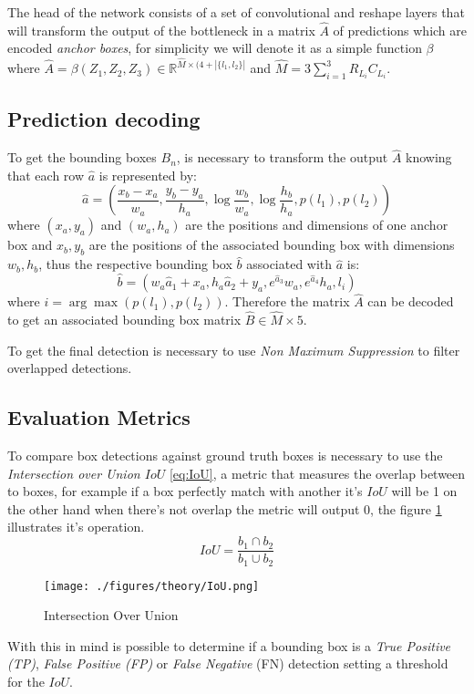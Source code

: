 \documentclass{IEEEtran}
\begin{document}
The head of the network consists of a set of convolutional and reshape layers
that will transform the output of the bottleneck in a matrix $\hat{A}$ of
predictions which are encoded \emph{anchor boxes}, for simplicity we will denote
it as a simple function $\beta$ where $\hat{A} = \beta(Z_1, Z_2, Z_3) \in
\mathbb{R}^{\hat{M} \times (4 + |\{l_1, l_2\}|}$ and $\hat{M} = 3 \sum_{i=1}^3
R_{L_i} C_{L_i}$.

\subsection{Prediction decoding}
To get the bounding boxes $B_n$, is necessary to transform the output $\hat{A}$
knowing that each row $\hat{a}$ is represented by:
$$
\hat{a} = \left(\frac{x_b - x_a}{w_a}, \frac{y_b - y_a}{h_a},
\log{\frac{w_b}{w_a}}, \log{\frac{h_b}{h_a}}, p(l_1), p(l_2)\right)
$$ 
where $(x_a, y_a)$ and $(w_a, h_a)$ are the positions and dimensions of one
anchor box and $x_b, y_b$ are the positions of the associated bounding box with
dimensions $w_b, h_b$, thus the respective bounding box $\hat{b}$ associated with
$\hat{a}$ is:
$$
\hat{b} = \left(w_a \hat{a}_1 + x_a, h_a \hat{a}_2 + y_a,
e^{\hat{a}_3} w_a , e^{\hat{a}_4} h_a, l_i \right)
$$
where $i = \arg \max{(p(l_1), p(l_2))}$. Therefore the matrix $\hat{A}$ can be
decoded to get an associated bounding box matrix $\hat{B} \in \hat{M} \times 5$.

To get the final detection is necessary to use \emph{Non Maximum Suppression} to
filter overlapped detections.

\subsection{Evaluation Metrics}
To compare box detections against ground truth boxes is necessary to use the
\emph{Intersection over Union $IoU$} \eqref{eq:IoU}, a metric that measures the
overlap between to boxes, for example if a box perfectly match with another it's
$IoU$ will be 1 on the other hand when there's not overlap the metric will
output 0, the figure \ref{fig:IoU} illustrates it's operation.
\begin{equation}
    IoU = \frac{b_1 \cap b_2}{b_1 \cup b_2}
    \label{eq:IoU}
\end{equation}
\begin{figure}[ht]
    \centering
    \texttt{[image: ./figures/theory/IoU.png]}
    \caption{Intersection Over Union}
    \label{fig:IoU}
\end{figure}
With this in mind is possible to determine if a bounding box is a \emph{True
Positive (TP)}, \emph{False Positive (FP)} or \emph{False Negative} (FN)
detection setting a threshold for the $IoU$.
\end{document}
